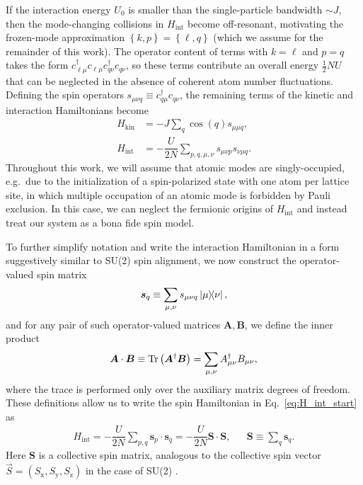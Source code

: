 \documentclass[nofootinbib,twocolumn]{revtex4-2}
\renewcommand{\t}{\text} %
\newcommand{\f}[2]{\dfrac{#1}{#2}} %
\newcommand{\p}[1]{\left(#1\right)} %
\renewcommand{\set}[1]{\left\{#1\right\}} %
\renewcommand{\v}{\bm} %
\renewcommand{\c}{\cdot} %
\newcommand{\1}{\mathds{1}}
\newcommand{\x}{\text{x}}
\newcommand{\y}{\text{y}}
\newcommand{\z}{\text{z}}
\begin{document}
If the interaction energy $U_0$ is smaller than the single-particle bandwidth $\sim J$, then the mode-changing collisions in $H_{\t{int}}$ become off-resonant, motivating the frozen-mode approximation $\set{k,p}=\set{\ell,q}$ (which we assume for the remainder of this work).
The operator content of terms with $k=\ell$ and $p=q$ takes the form $c_{\ell\mu}^\dag c_{\ell\mu} c_{q\nu}^\dag c_{q\nu}$, so these terms contribute an overall energy $\frac12NU$ that can be neglected in the absence of coherent atom number fluctuations.
Defining the spin operators $s_{\mu\nu q}\equiv c_{q\mu}^\dag c_{q\nu}$, the remaining terms of the kinetic and interaction Hamiltonians become
\begin{align}
  H_{\t{kin}} &= -J\sum_q \cos\p{q} s_{\mu\mu q},
  \label{H_kin_start} \\
  H_{\t{int}} &= -\f{U}{2N} \sum_{p,q,\mu,\nu} s_{\mu\nu p} s_{\nu\mu q}.
  \label{eq:H_int_start}
\end{align}
Throughout this work, we will assume that atomic modes are singly-occupied, e.g.~due to the initialization of a spin-polarized state with one atom per lattice site, in which multiple occupation of an atomic mode is forbidden by Pauli exclusion.
In this case, we can neglect the fermionic origins of $H_{\t{int}}$ and instead treat our system as a bona fide spin model.

To further simplify notation and write the interaction Hamiltonian in a form suggestively similar to SU(2) spin alignment, we now construct the operator-valued spin matrix
\begin{align}
  \v s_q \equiv \sum_{\mu,\nu} s_{\mu\nu q} \op{\mu}{\nu},
\end{align}
and for any pair of such operator-valued matrices $\v A,\v B$, we define the inner product
\begin{align}
  \v A \c \v B \equiv \Tr\p{\v A^\dag\v B}
  = \sum_{\mu,\nu} A_{\mu\nu}^\dag B_{\mu\nu},
\end{align}
where the trace is performed only over the auxiliary matrix degrees of freedom.
These definitions allow us to write the spin Hamiltonian in Eq.~\eqref{eq:H_int_start} as
\begin{align}
  H_{\t{int}} = -\f{U}{2N} \sum_{p,q} \v s_p\c\v s_q
  = -\f{U}{2N}\v S\c\v S,
  &&
  \v S \equiv \sum_q \v s_q.
  \label{eq:H_int}
\end{align}
Here $\v S$ is a collective spin matrix, analogous to the collective spin vector $\vec S=\p{S_\x,S_\y,S_\z}$ in the case of SU(2) \cite{he2019engineering}.
\end{document}
